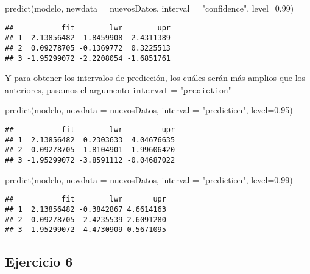 \documentclass[
]{article}
\newenvironment{Shaded}{\begin{snugshade}}{\end{snugshade}}
\newcommand{\AttributeTok}[1]{\textcolor[rgb]{0.77,0.63,0.00}{#1}}
\newcommand{\FloatTok}[1]{\textcolor[rgb]{0.00,0.00,0.81}{#1}}
\newcommand{\FunctionTok}[1]{\textcolor[rgb]{0.00,0.00,0.00}{#1}}
\newcommand{\NormalTok}[1]{#1}
\newcommand{\StringTok}[1]{\textcolor[rgb]{0.31,0.60,0.02}{#1}}
\begin{document}
\begin{Shaded}
\begin{Highlighting}[]
\FunctionTok{predict}\NormalTok{(modelo, }\AttributeTok{newdata =}\NormalTok{ nuevosDatos, }\AttributeTok{interval =} \StringTok{"confidence"}\NormalTok{, }\AttributeTok{level=}\FloatTok{0.99}\NormalTok{)}
\end{Highlighting}
\end{Shaded}

\begin{verbatim}
##           fit        lwr        upr
## 1  2.13856482  1.8459908  2.4311389
## 2  0.09278705 -0.1369772  0.3225513
## 3 -1.95299072 -2.2208054 -1.6851761
\end{verbatim}

Y para obtener los intervalos de predicción, los cuáles serán más
amplios que los anteriores, pasamos el argumento
\(\texttt{interval = "prediction"}\)

\begin{Shaded}
\begin{Highlighting}[]
\FunctionTok{predict}\NormalTok{(modelo, }\AttributeTok{newdata =}\NormalTok{ nuevosDatos, }\AttributeTok{interval =} \StringTok{"prediction"}\NormalTok{, }\AttributeTok{level=}\FloatTok{0.95}\NormalTok{)}
\end{Highlighting}
\end{Shaded}

\begin{verbatim}
##           fit        lwr         upr
## 1  2.13856482  0.2303633  4.04676635
## 2  0.09278705 -1.8104901  1.99606420
## 3 -1.95299072 -3.8591112 -0.04687022
\end{verbatim}

\begin{Shaded}
\begin{Highlighting}[]
\FunctionTok{predict}\NormalTok{(modelo, }\AttributeTok{newdata =}\NormalTok{ nuevosDatos, }\AttributeTok{interval =} \StringTok{"prediction"}\NormalTok{, }\AttributeTok{level=}\FloatTok{0.99}\NormalTok{)}
\end{Highlighting}
\end{Shaded}

\begin{verbatim}
##           fit        lwr       upr
## 1  2.13856482 -0.3842867 4.6614163
## 2  0.09278705 -2.4235539 2.6091280
## 3 -1.95299072 -4.4730909 0.5671095
\end{verbatim}

\hypertarget{ejercicio-6}{%
\subsection{Ejercicio 6}\label{ejercicio-6}}
\end{document}
